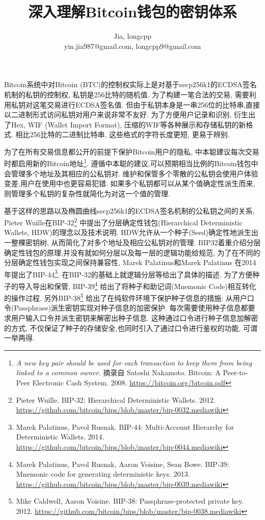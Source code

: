 \documentclass{article}
\begin{document}
\title{深入理解Bitcoin钱包的密钥体系}
\author{Jia, longcpp \\ \small{yin.jia987@gmail.com, longcpp9@gmail.com}}

\maketitle

Bitcoin系统中对Bitcoin (BTC)的控制权实际上是对基于secp256k1的ECDSA签名机制的私钥的控制权,
私钥是256比特的随机值. 为了构建一笔合法的交易, 需要利用私钥对这笔交易进行ECDSA签名值.
但由于私钥本身是一串256位的比特串,直接以二进制形式访问私钥对用户来说非常不友好.
为了方便用户记录和识别, 衍生出了Hex, WIF (Wallet Import Format), 压缩的WIF等各种展示和存储私钥的新格式.
相比256比特的二进制比特串, 这些格式的字符长度更短, 更易于辨别. 

为了在所有交易信息都公开的前提下保护Bitcoin用户的隐私,
中本聪建议每次交易时都启用新的Bitcoin地址\footnote{
\textit{A new key pair should be used for each transaction to keep them from being linked to a common owner.}
摘录自 Satoshi Nakamoto. Bitcoin: A Peer-to-Peer Electronic Cash System. 2008. 
\url{https://bitcoin.org/bitcoin.pdf}}.
遵循中本聪的建议,可以预期相当比例的Bitcoin钱包中会管理多个地址及其相应的公私钥对.
维护和保管多个零散的公私钥会使用户体验变差,用户在使用中也更容易犯错.
如果多个私钥都可以从某个值确定性派生而来,则管理多个私钥的复杂性就简化为对这一个值的管理.

基于这样的思路以及椭圆曲线secp256k1的ECDSA签名机制的公私钥之间的关系,
Pieter Wuille在BIP-32\footnote{
Pieter Wuille. BIP-32: Hierarchical Deterministic Wallets. 2012. 
\url{https://github.com/bitcoin/bips/blob/master/bip-0032.mediawiki}}
中提出了分层确定性钱包(Hierarchical Deterministic Wallets, HDW)的理念以及技术说明.
HDW允许从一个种子(Seed)确定性地派生出一整棵密钥树, 从而简化了对多个地址及相应公私钥对的管理.
BIP32着重介绍分层确定性钱包的原理,并没有就如何分层以及每一层的逻辑功能给规范,
为了在不同的分层确定性钱包实现之间保持兼容性, Marek Palatinus和Marek Palatinus
在2014年提出了BIP-44\footnote{
Marek Palatinus, Pavol Rusnak. BIP-44: Multi-Account Hierarchy for Deterministic Wallets. 2014.
\url{https://github.com/bitcoin/bips/blob/master/bip-0044.mediawiki}},
在BIP-32的基础上就逻辑分层等给出了具体的描述.
为了方便种子的导入导出和保管, 
BIP-39\footnote{
Marek Palatinus, Pavol Rusnak, Aaron Voisine, Sean Bowe. 
BIP-39: Mnemonic code for generating deterministic keys. 2013.
\url{https://github.com/bitcoin/bips/blob/master/bip-0039.mediawiki}}
给出了将种子和助记词(Mnemonic Code)相互转化的操作过程.
另外BIP-38\footnote{
Mike Caldwell, Aaron Voisine. BIP-38: Passphrase-protected private key. 2012.
\url{https://github.com/bitcoin/bips/blob/master/bip-0038.mediawiki}}
给出了在纯软件环境下保护种子信息的措施: 从用户口令(Passphrase)派生密钥实现对种子信息的加密保护.
每次需要使用种子信息都要求用户输入口令并派生密钥来解密出种子信息.
这种通过口令进行种子信息加解密的方式,
不仅保证了种子的存储安全,也同时引入了通过口令进行鉴权的功能, 可谓一举两得.
\end{document}
